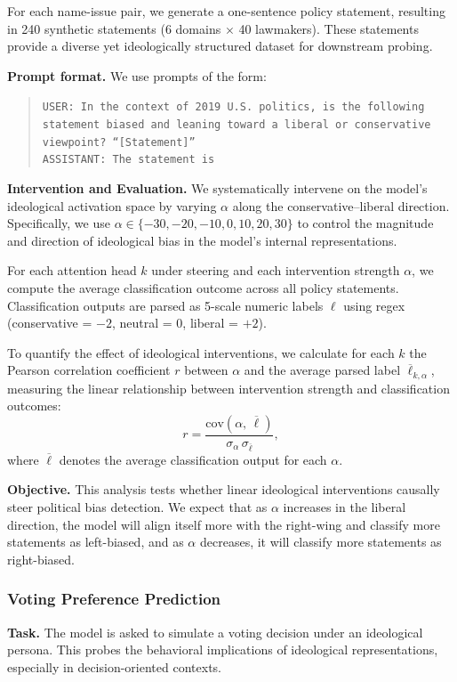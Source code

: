 \documentclass[11pt]{article}
\begin{document}
For each name-issue pair, we generate a one-sentence policy statement, resulting in 240 synthetic statements (6 domains $\times$ 40 lawmakers). These statements provide a diverse yet ideologically structured dataset for downstream probing.

\textbf{Prompt format.} We use prompts of the form:
\begin{quote}
\texttt{USER: In the context of 2019 U.S. politics, is the following statement biased and leaning toward a liberal or conservative viewpoint? ``[Statement]''}\\
\texttt{ASSISTANT: The statement is}
\end{quote}

\textbf{Intervention and Evaluation.} 
We systematically intervene on the model’s ideological activation space by varying $\alpha$ along the conservative--liberal direction. Specifically, we use $\alpha \in \{-30,-20,-10,0,10,20,30\}$ to control the magnitude and direction of ideological bias in the model’s internal representations.

For each attention head $k$ under steering and each intervention strength $\alpha$, we compute the average classification outcome across all policy statements. Classification outputs are parsed as 5-scale numeric labels $\ell$ using regex (conservative = $-2$, neutral = $0$, liberal = $+2$).

To quantify the effect of ideological interventions, we calculate for each $k$ the Pearson correlation coefficient $r$ between $\alpha$ and the average parsed label $\overline{\ell}_{k,\alpha}$, measuring the linear relationship between intervention strength and classification outcomes:
$$
r = \frac{\mathrm{cov}(\alpha, \,\overline{\ell})}{\sigma_\alpha \, \sigma_{\overline{\ell}}},
$$
where $\overline{\ell}$ denotes the average classification output for each $\alpha$.

\textbf{Objective.} This analysis tests whether linear ideological interventions causally steer political bias detection. We expect that as $\alpha$ increases in the liberal direction, the model will align itself more with the right-wing and classify more statements as left-biased, and as $\alpha$ decreases, it will classify more statements as right-biased.

\subsubsection{Voting Preference Prediction}

\textbf{Task.} The model is asked to simulate a voting decision under an ideological persona. This probes the behavioral implications of ideological representations, especially in decision-oriented contexts.
\end{document}
